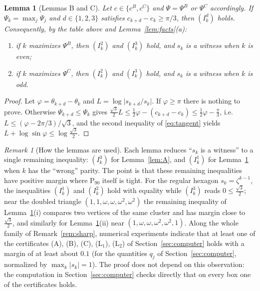 \documentclass[11pt]{amsart}
\newtheorem{lemma}[theorem]{Lemma}
\theoremstyle{definition}
\theoremstyle{remark}
\newtheorem{remark}[theorem]{Remark}
\newcommand{\Pn}{\mathrm{P}_{90}}
\newcommand{\sq}{\tfrac{\sqrt3}{2}}
\begin{document}
\begin{lemma}[Lemmas B and C]\label{lem:BC}
Let $c\in\{c^B,c^C\}$ and $\Psi=\Psi^B$ or $\Psi^C$ accordingly. If $\Psi_k=\max_j\Psi_j$ and $d\in\{1,2,3\}$ satisfies $c_{k+d}-c_k\ge\pi/3$, then $(I^d_k)$ holds. Consequently, by the table above and Lemma~\ref{lem:facts}(a):
\begin{enumerate}[label=\textup{(\roman*)}]
\item if $k$ maximizes $\Psi^B$, then $(I^2_k)$ and $(I^3_k)$ hold, and $s_k$ is a witness when $k$ is even;
\item if $k$ maximizes $\Psi^C$, then $(I^2_k)$ and $(I^3_k)$ hold, and $s_k$ is a witness when $k$ is odd.
\end{enumerate}
\end{lemma}

\begin{proof}
Let $\varphi=\theta_{k+d}-\theta_k$ and $L=\log\lvert s_{k+d}/s_k\rvert$. If $\varphi\ge\pi$ there is nothing to prove. Otherwise $\Psi_{k+d}\le\Psi_k$ gives $\frac{\sqrt3}{2}L\le\frac12\varphi-(c_{k+d}-c_k)\le\frac12\varphi-\frac\pi3$, i.e.\ $L\le(\varphi-2\pi/3)/\sqrt3$, and the second inequality of \eqref{eq:tangent} yields $L+\log\sin\varphi\le\log\sq$.
\end{proof}

\begin{remark}[How the lemmas are used]\label{rem:roles}
Each lemma reduces ``$s_k$ is a witness'' to a single remaining inequality: $(I^3_k)$ for Lemma~\ref{lem:A}, and $(I^1_k)$ for Lemma~\ref{lem:BC} when $k$ has the ``wrong'' parity. The point is that these remaining inequalities have positive margin where $\Pn$ itself is tight. For the regular hexagon $s_k=\zeta^{k-1}$, the inequalities $(I^1_k)$ and $(I^2_k)$ hold with equality while $(I^3_k)$ reads $0\le\sq$; near the doubled triangle $(1,1,\omega,\omega,\omega^2,\omega^2)$ the remaining inequality of Lemma~\ref{lem:BC}(i) compares two vertices of the same cluster and has margin close to $\sq$, and similarly for Lemma~\ref{lem:BC}(ii) near $(1,\omega,\omega,\omega^2,\omega^2,1)$. Along the whole family of Remark~\ref{rem:sharp}, numerical experiments indicate that at least one of the certificates (A), (B), (C), (L$_1$), (L$_2$) of Section~\ref{sec:computer} holds with a margin of at least about $0.1$ (for the quantities $q_j$ of Section~\ref{sec:computer}, normalized by $\max_k\lvert s_k\rvert=1$). The proof does not depend on this observation: the computation in Section~\ref{sec:computer} checks directly that on every box one of the certificates holds.
\end{remark}
\end{document}
